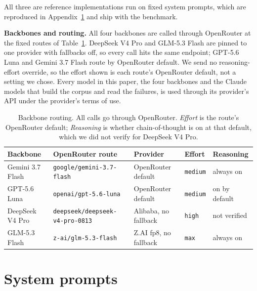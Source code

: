\documentclass{article}
\begin{document}
All three are reference implementations run on fixed system prompts, which are reproduced in Appendix~\ref{app:prompts} and ship with the benchmark.

\textbf{Backbones and routing.} All four backbones are called through OpenRouter at the fixed
routes of Table~\ref{tab:backbones}. DeepSeek V4 Pro and GLM-5.3 Flash are pinned to one provider
with fallbacks off, so every call hits the same endpoint; GPT-5.6 Luna and Gemini 3.7 Flash route by
OpenRouter default. We send no reasoning-effort override, so the effort shown is each route's
OpenRouter default, not a setting we chose. Every model in this paper, the four backbones and the
Claude models that build the corpus and read the failures, is used through its provider's API under
the provider's terms of use.

\begin{table}[h]
  \centering
  \caption{Backbone routing. All calls go through OpenRouter. \emph{Effort} is the route's
  OpenRouter default; \emph{Reasoning} is whether chain-of-thought is on at
  that default, which we did not verify for DeepSeek V4 Pro.}
  \label{tab:backbones}
  \footnotesize
  \setlength{\tabcolsep}{4pt}
  \begin{tabular}{@{}lllll@{}}
    \toprule
    Backbone & OpenRouter route & Provider & Effort & Reasoning \\
    \midrule
    Gemini 3.7 Flash & \texttt{google/gemini-3.7-flash}        & OpenRouter default    & \texttt{medium} & always on \\
    GPT-5.6 Luna     & \texttt{openai/gpt-5.6-luna}            & OpenRouter default    & \texttt{medium} & on by default \\
    DeepSeek V4 Pro  & \texttt{deepseek/deepseek-v4-pro-0813}  & Alibaba, no fallback  & \texttt{high}   & not verified \\
    GLM-5.3 Flash    & \texttt{z-ai/glm-5.3-flash}             & Z.AI fp8, no fallback & \texttt{max}    & always on \\
    \bottomrule
  \end{tabular}
\end{table}

\section{System prompts}
\label{app:prompts}
\end{document}
